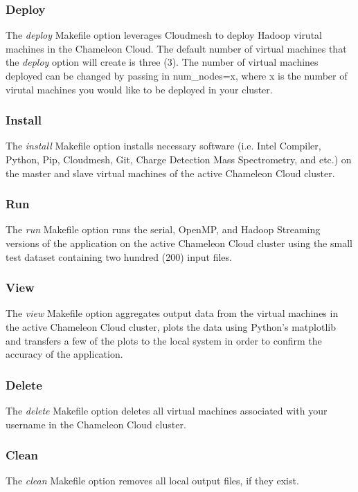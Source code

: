 \documentclass[9pt,twocolumn,twoside]{../../styles/osajnl}
\begin{document}
\subsubsection{Deploy}
The \emph{deploy} Makefile option leverages Cloudmesh to deploy Hadoop
virutal machines in the Chameleon Cloud. The default number of virtual
machines that the \emph{deploy} option will create is three (3). The
number of virtual machines deployed can be changed by passing in
num\_nodes=x, where x is the number of virutal machines you would like
to be deployed in your cluster.
\subsubsection{Install}
The \emph{install} Makefile option installs necessary software
(i.e. Intel Compiler, Python, Pip, Cloudmesh, Git, Charge Detection
Mass Spectrometry, and etc.) on the master and slave virtual machines
of the active Chameleon Cloud cluster.
\subsubsection{Run}
The \emph{run} Makefile option runs the serial, OpenMP, and Hadoop
Streaming versions of the application on the active Chameleon Cloud
cluster using the small test dataset containing two hundred (200)
input files.
\subsubsection{View}
The \emph{view} Makefile option aggregates output data from the
virtual machines in the active Chameleon Cloud cluster, plots the data
using Python's matplotlib and transfers a few of the plots to the
local system in order to confirm the accuracy of the application.
\subsubsection{Delete}
The \emph{delete} Makefile option deletes all virtual machines
associated with your username in the Chameleon Cloud cluster.
\subsubsection{Clean}
The \emph{clean} Makefile option removes all local output files, if
they exist.
\end{document}
